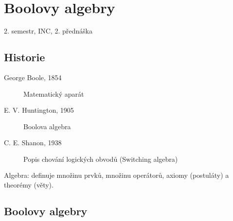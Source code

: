 \documentclass[a4paper, 11pt]{report}
\begin{document}
\setcounter{chapter}{18}
\chapter{Boolovy algebry} \label{cha:19}

2. semestr, INC, 2. přednáška

\section{Historie}
\begin{description}
	\item[George Boole, 1854] Matematický aparát
	\item[E. V. Huntington, 1905] Boolova algebra
	\item[C. E. Shanon, 1938] Popis chování logických obvodů (Switching algebra)
\end{description}

Algebra: definuje množinu prvků, množinu operátorů, axiomy (postuláty) a theorémy (věty).

\section{Boolovy algebry}
\end{document}
